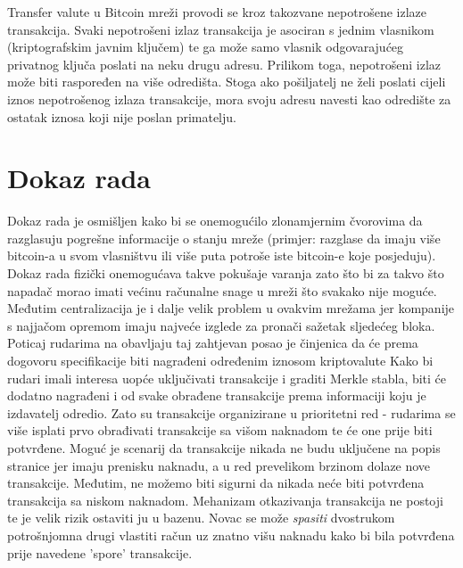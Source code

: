 \documentclass[utf8, zavrsni]{fer}
\begin{document}
Transfer valute u Bitcoin mreži provodi se kroz takozvane nepotrošene izlaze transakcija\footnotemark. Svaki nepotrošeni izlaz transakcija je asociran s jednim vlasnikom (kriptografskim javnim ključem) te ga može samo vlasnik odgovarajućeg privatnog ključa poslati na neku drugu adresu. Prilikom toga, nepotrošeni izlaz može biti raspoređen na više odredišta. Stoga ako pošiljatelj ne želi poslati cijeli iznos nepotrošenog izlaza transakcije, mora svoju adresu navesti kao odredište za ostatak iznosa koji nije poslan primatelju.

\section{Dokaz rada}
Dokaz rada je osmišljen kako bi se onemogućilo zlonamjernim čvorovima da razglasuju pogrešne informacije o stanju mreže (primjer: razglase da imaju više bitcoin-a u svom vlasništvu ili više puta potroše iste bitcoin-e koje posjeduju). Dokaz rada fizički onemogućava takve pokušaje varanja zato što bi za takvo što napadač morao imati većinu računalne snage u mreži što svakako nije moguće. Međutim centralizacija je i dalje velik problem u ovakvim mrežama jer kompanije s najjačom opremom imaju najveće izglede za pronači sažetak sljedećeg bloka. Poticaj rudarima na obavljaju taj zahtjevan posao je činjenica da će prema dogovoru specifikacije biti nagrađeni određenim iznosom kriptovalute\footnotemark
{}
Kako bi rudari imali interesa uopće uključivati transakcije i graditi Merkle stabla, biti će dodatno nagrađeni i od svake obrađene transakcije prema informaciji koju je izdavatelj odredio. Zato su transakcije organizirane u prioritetni red - rudarima se više isplati prvo obrađivati transakcije sa višom naknadom te će one prije biti potvrđene. Moguć je scenarij da transakcije nikada ne budu uključene na popis stranice jer imaju prenisku naknadu, a u red prevelikom brzinom dolaze nove transakcije. Međutim, ne možemo biti sigurni da nikada neće biti potvrđena transakcija sa niskom naknadom. Mehanizam otkazivanja transakcija ne postoji te je velik rizik ostaviti ju u bazenu. Novac se može \textit{spasiti} dvostrukom potrošnjom\footnotemark na drugi vlastiti račun uz znatno višu naknadu kako bi bila potvrđena prije navedene 'spore' transakcije.
\end{document}
